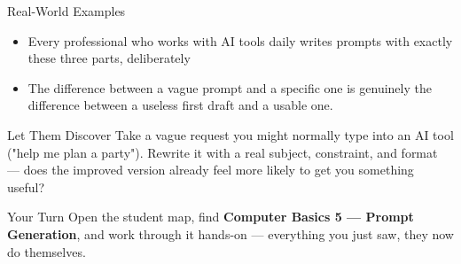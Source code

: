 \documentclass[aspectratio=169]{beamer}
\begin{document}
\begin{frame}{Real-World Examples}
    \large
    \begin{itemize}
        \item Every professional who works with AI tools daily writes prompts with exactly these three parts, deliberately
        \item The difference between a vague prompt and a specific one is genuinely the difference between a useless first draft and a usable one.
    \end{itemize}
\end{frame}


\begin{frame}{Let Them Discover}
    \Large
    Take a vague request you might normally type into an AI tool ("help me plan a party"). Rewrite it with a real subject, constraint, and format — does the improved version already feel more likely to get you something useful?
\end{frame}

\begin{frame}{Your Turn}
    \Large
    Open the student map, find \textbf{Computer Basics 5 — Prompt Generation}, and work through it
    hands-on --- everything you just saw, they now do themselves.
\end{frame}
\end{document}
